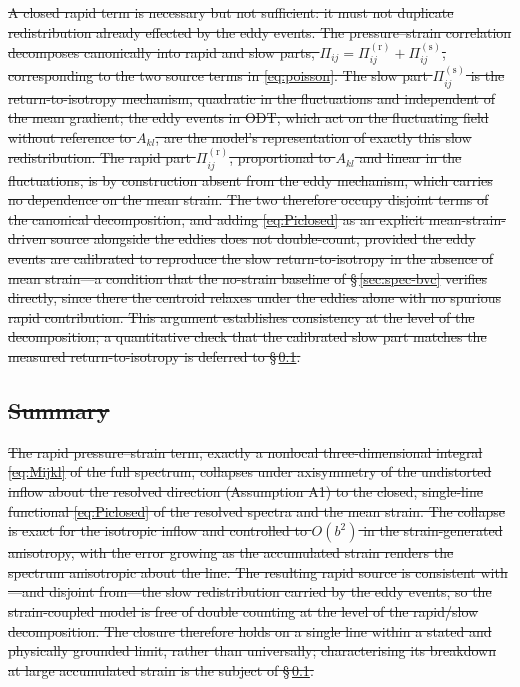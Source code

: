 \documentclass[lineno]{JFM-FLM_Au}
\providecommand{\DIFdel}[1]{{\protect\color{red}\sout{#1}}}                      %
\begin{document}
\DIFdel{A closed rapid term is necessary but not sufficient: it must not duplicate
redistribution already effected by the eddy events. The pressure--strain
correlation decomposes canonically into rapid and slow parts,
$\Pi_{ij}=\Pi^{(\mathrm r)}_{ij}+\Pi^{(\mathrm s)}_{ij}$, corresponding to the
two source terms in \eqref{eq:poisson}. The slow part
$\Pi^{(\mathrm s)}_{ij}$ is the return-to-isotropy mechanism, quadratic in the
fluctuations and independent of the mean gradient; the eddy events in ODT,
which act on the fluctuating field without reference to $A_{kl}$, are the
model's representation of exactly this slow redistribution. The rapid part
$\Pi^{(\mathrm r)}_{ij}$, proportional to $A_{kl}$ and linear in the
fluctuations, is by construction absent from the eddy mechanism, which carries
no dependence on the mean strain. The two therefore occupy disjoint terms of
the canonical decomposition, and adding \eqref{eq:Piclosed} as an explicit
mean-strain-driven source alongside the eddies does not double-count, provided
the eddy events are calibrated to reproduce the slow return-to-isotropy in the
absence of mean strain---a condition that the no-strain baseline of
\S\,\ref{sec:spec-bvc} verifies directly, since there the centroid relaxes
under the eddies alone with no spurious rapid contribution. This argument
establishes consistency at the level of the decomposition; a quantitative
check that the calibrated slow part matches the measured return-to-isotropy is
deferred to \S\,\ref{}.%
}%

\subsection{\DIFdel{Summary}}%
\addtocounter{subsection}{-1}%

\DIFdel{The rapid pressure--strain term, exactly a nonlocal three-dimensional integral
\eqref{eq:Mijkl} of the full spectrum, collapses under axisymmetry of the
undistorted inflow about the resolved direction (Assumption A1) to the closed,
single-line functional \eqref{eq:Piclosed} of the resolved spectra and the
mean strain. The collapse is exact for the isotropic inflow and controlled to
$O(b^2)$ in the strain-generated anisotropy, with the error growing as the
accumulated strain renders the spectrum anisotropic about the line. The
resulting rapid source is consistent with---and disjoint from---the slow
redistribution carried by the eddy events, so the strain-coupled model is free
of double counting at the level of the rapid/slow decomposition. The closure
therefore holds on a single line within a stated and physically grounded
limit, rather than universally; characterising its breakdown at large
accumulated strain is the subject of \S\,\ref{}.%
}%
\end{document}
